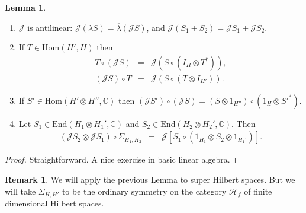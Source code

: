 \documentclass[12pt]{article}
\theoremstyle{definition}
\newtheorem{lemma}[thm]{Lemma}
\theoremstyle{definition}
\newtheorem{note}[thm]{Remark}
\theoremstyle{remark}
\def\2#1{{\mathcal #1}}
\def\7#1{{\mathbb #1}}
\newcommand{\Hom}{\mathrm{Hom}}
\newcommand{\End}{\mathrm{End}}
\begin{document}
\begin{lemma} \mbox{}
  \begin{enumerate}
  \item $\2J$ is antilinear: $\2J(\lambda S)=\overline{\lambda}(\2JS)$, and
    $\2J(S_1+S_2)=\2JS_1+\2JS_2$.
  \item \label{magic} If $T\in \Hom (H',H)$ then \begin{eqnarray*}
      T\circ (\2JS) &=& \2J(S\circ (I_{H}\otimes T^{*})) ,\\
      (\2JS)\circ T &=& \2J(S\circ (T\otimes I_{H'})) . \end{eqnarray*}
  \item If $S'\in \Hom (H'\otimes H'', \7C )$ then $(\2JS')\circ (\2JS)=(S\otimes
    1_{H''})\circ (1_{H}\otimes S'^*)$.
   \item Let $S_1\in \End (H_1\otimes H_1',\7C )$ and $S_2\in \End (H_2\otimes
     H_2',\7C )$.  Then
   \begin{eqnarray*} (\2JS_2 \otimes \2JS_1)\circ \Sigma _{H_1,H_2} &=&\2J[S_1\circ
     (1_{H_1}\otimes S_2\otimes 1_{H_1'})] .
   \end{eqnarray*}
\end{enumerate} \label{trivial}
\end{lemma}

\begin{proof} Straightforward.  A nice exercise in basic linear
  algebra. \end{proof}

\begin{note} We will apply the previous Lemma to super Hilbert spaces.
  But we will take $\Sigma _{H,H'}$ to be the ordinary symmetry on the
  category $\2H _f$ of finite dimensional Hilbert spaces. \end{note}
\end{document}
